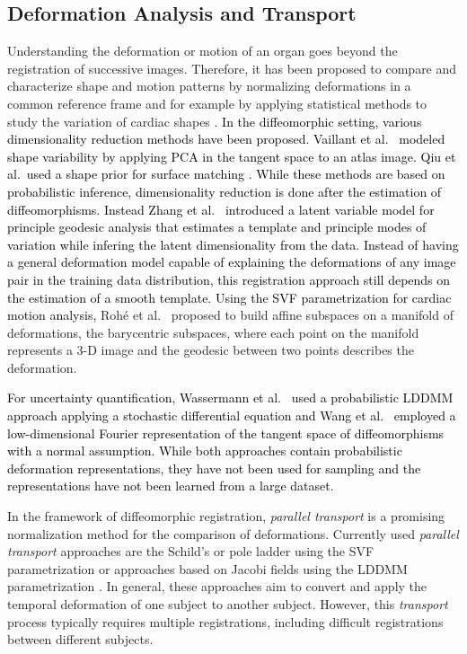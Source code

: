 \documentclass[journal]{IEEEtran}
\newcommand{\update}[1]{\textcolor{black}{#1}}
\begin{document}
\subsection{Deformation Analysis and Transport}
Understanding the deformation or motion of an organ goes beyond the registration of successive images. Therefore, it has been proposed to compare and characterize shape and motion patterns by normalizing deformations in a common reference frame \cite{lorenzi2014efficient,duchateau2011spatiotemporal} and for example by applying statistical methods to study the variation of cardiac shapes \cite{bai2015bi}. \update{In the diffeomorphic setting, various dimensionality reduction methods have been proposed. Vaillant et al.\ \cite{vaillant2004statistics} modeled shape variability by applying PCA in the tangent space to an atlas image. Qiu et al.\ used a shape prior for surface matching \cite{qiu2012principal}. While these methods are based on probabilistic inference, dimensionality reduction is done after the estimation of diffeomorphisms. Instead Zhang et al.\ \cite{zhang2014bayesian} introduced a latent variable model for principle geodesic analysis that estimates a template and principle modes of variation while infering the latent dimensionality from the data. Instead of having a general deformation model capable of explaining the deformations of any image pair in the training data distribution, this registration approach still depends on the estimation of a smooth template. Using the SVF parametrization for cardiac motion analysis,} Roh\'e et al.\ \cite{rohe2018low} proposed to build affine subspaces on a manifold of deformations, the barycentric subspaces, where each point on the manifold represents a 3-D image and the geodesic between two points describes the deformation.

\update{For uncertainty quantification, Wassermann et al.~\cite{wassermann2014probabilistic} used a probabilistic LDDMM approach applying a stochastic differential equation and Wang et al.~\cite{wang2018efficient} employed a low-dimensional Fourier representation of the tangent space of diffeomorphisms with a normal assumption. While both approaches contain probabilistic deformation representations, they have not been used for sampling and the representations have not been learned from a large dataset.}

In the framework of diffeomorphic registration, \emph{parallel transport} is a promising normalization method for the comparison of deformations.  Currently used \emph{parallel transport} approaches are the Schild's \cite{lorenzi2011schild} or pole ladder \cite{lorenzi2014efficient,jia2018parallel} using the SVF parametrization or approaches based on Jacobi fields using the LDDMM parametrization \cite{younes2007jacobi,louis2017parallel}. In general, these approaches aim to convert and apply the temporal deformation of one subject to another subject. However, this \emph{transport} process typically requires multiple registrations, including difficult registrations between different subjects. 
\end{document}
